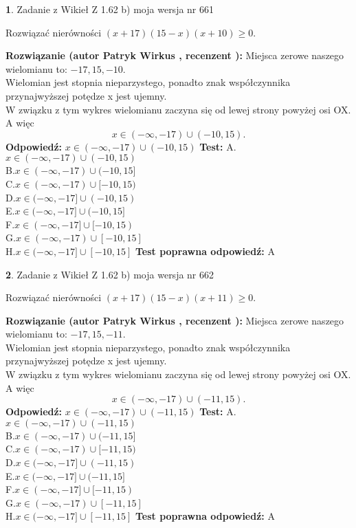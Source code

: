 \documentclass[12pt, a4paper]{article}
\theoremstyle{definition} %
\newtheorem{zad}{}
\newcommand{\zadStart}[1]{\begin{zad}#1\newline}
\newcommand{\zadStop}{\end{zad}}
\newcommand{\rozwStart}[2]{\noindent \textbf{Rozwiązanie (autor #1 , recenzent #2): }\newline}
\newcommand{\rozwStop}{\newline}
\newcommand{\odpStart}{\noindent \textbf{Odpowiedź:}\newline}
\newcommand{\odpStop}{\newline}
\newcommand{\testStart}{\noindent \textbf{Test:}\newline}
\newcommand{\testStop}{\newline}
\newcommand{\kluczStart}{\noindent \textbf{Test poprawna odpowiedź:}\newline}
\newcommand{\kluczStop}{\newline}
\begin{document}
\zadStart{Zadanie z Wikieł Z 1.62 b) moja wersja nr 661}

Rozwiązać nierówności $(x+17)(15-x)(x+10)\ge0$.
\zadStop
\rozwStart{Patryk Wirkus}{}
Miejsca zerowe naszego wielomianu to: $-17, 15, -10$.\\
Wielomian jest stopnia nieparzystego, ponadto znak współczynnika przy\linebreak najwyższej potędze x jest ujemny.\\ W związku z tym wykres wielomianu zaczyna się od lewej strony powyżej osi OX. A więc $$x \in (-\infty,-17) \cup (-10,15).$$
\rozwStop
\odpStart
$x \in (-\infty,-17) \cup (-10,15)$
\odpStop
\testStart
A.$x \in (-\infty,-17) \cup (-10,15)$\\
B.$x \in (-\infty,-17) \cup (-10,15]$\\
C.$x \in (-\infty,-17) \cup [-10,15)$\\
D.$x \in (-\infty,-17] \cup (-10,15)$\\
E.$x \in (-\infty,-17] \cup (-10,15]$\\
F.$x \in (-\infty,-17] \cup [-10,15)$\\
G.$x \in (-\infty,-17) \cup [-10,15]$\\
H.$x \in (-\infty,-17] \cup [-10,15]$
\testStop
\kluczStart
A
\kluczStop



\zadStart{Zadanie z Wikieł Z 1.62 b) moja wersja nr 662}

Rozwiązać nierówności $(x+17)(15-x)(x+11)\ge0$.
\zadStop
\rozwStart{Patryk Wirkus}{}
Miejsca zerowe naszego wielomianu to: $-17, 15, -11$.\\
Wielomian jest stopnia nieparzystego, ponadto znak współczynnika przy\linebreak najwyższej potędze x jest ujemny.\\ W związku z tym wykres wielomianu zaczyna się od lewej strony powyżej osi OX. A więc $$x \in (-\infty,-17) \cup (-11,15).$$
\rozwStop
\odpStart
$x \in (-\infty,-17) \cup (-11,15)$
\odpStop
\testStart
A.$x \in (-\infty,-17) \cup (-11,15)$\\
B.$x \in (-\infty,-17) \cup (-11,15]$\\
C.$x \in (-\infty,-17) \cup [-11,15)$\\
D.$x \in (-\infty,-17] \cup (-11,15)$\\
E.$x \in (-\infty,-17] \cup (-11,15]$\\
F.$x \in (-\infty,-17] \cup [-11,15)$\\
G.$x \in (-\infty,-17) \cup [-11,15]$\\
H.$x \in (-\infty,-17] \cup [-11,15]$
\testStop
\kluczStart
A
\kluczStop
\end{document}
